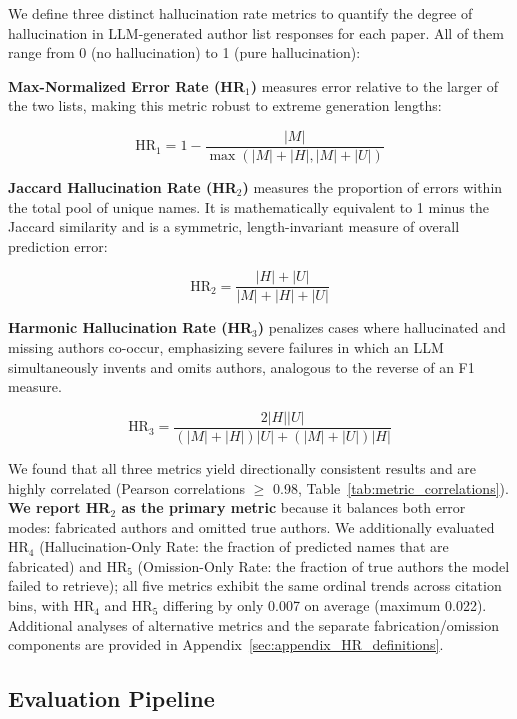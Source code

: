 \documentclass[11pt]{article}
\begin{document}
We define three distinct hallucination rate metrics to quantify the degree of hallucination in LLM-generated author list responses for each paper.
All of them range from 0 (no hallucination) to 1 (pure hallucination):

\textbf{Max-Normalized Error Rate (HR$_1$)} measures error relative to the larger of the two lists, making this metric robust to extreme generation lengths:

\begin{equation}
\text{HR}_1 = 1 - \frac{|M|}{\max(|M|+|H|, |M|+|U|)}
\end{equation}

\textbf{Jaccard Hallucination Rate (HR$_2$)} measures the proportion of errors within the total pool of unique names. It is mathematically equivalent to 1 minus the Jaccard similarity and is a symmetric, length-invariant measure of overall prediction error:

\begin{equation}
\text{HR}_2 = \frac{|H|+|U|}{|M|+|H|+|U|}\label{eqn:hr2}
\end{equation}

\textbf{Harmonic Hallucination Rate (HR$_3$)} penalizes cases where hallucinated and missing authors co-occur, emphasizing severe failures in which an LLM simultaneously invents and omits authors, analogous to the reverse of an F1 measure.

\begin{equation}
\text{HR}_3 = \frac{2 |H| |U|}{(|M|+|H|) |U| + (|M|+|U|) |H|}
\end{equation}

We found that all three metrics yield directionally consistent results and are highly correlated (Pearson correlations $\ge$ 0.98, Table~\ref{tab:metric_correlations}).  \textbf{We report HR$_2$ as the primary metric} because it balances both error modes: fabricated authors and omitted true authors. We additionally evaluated HR$_4$ (Hallucination-Only Rate: the fraction of predicted names that are fabricated) and HR$_5$ (Omission-Only Rate: the fraction of true authors the model failed to retrieve); all five metrics exhibit the same ordinal trends across citation bins, with HR$_4$ and HR$_5$ differing by only 0.007 on average (maximum 0.022). Additional analyses of alternative metrics and the separate fabrication/omission components are provided in Appendix~\ref{sec:appendix_HR_definitions}.

\subsection{Evaluation Pipeline}
\label{sec:eval_comparison}
\end{document}
